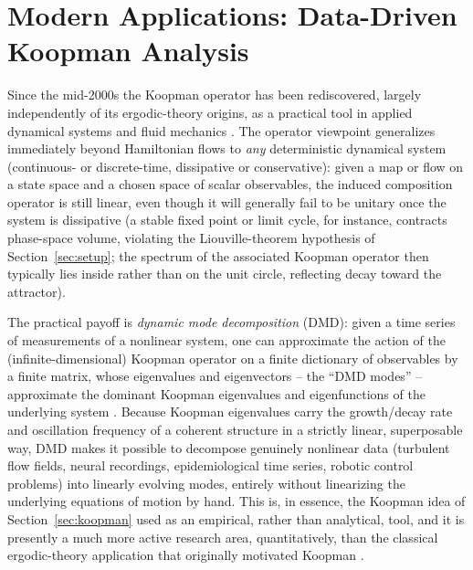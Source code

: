 \documentclass[11pt]{article}
\theoremstyle{remark}
\begin{document}
\section{Modern Applications: Data-Driven Koopman Analysis}
\label{sec:dmd}

Since the mid-2000s the Koopman operator has been rediscovered, largely independently of its ergodic-theory origins, as a practical tool in applied dynamical systems and fluid mechanics \cite{Mezic2005}. The operator viewpoint generalizes immediately beyond Hamiltonian flows to \emph{any} deterministic dynamical system (continuous- or discrete-time, dissipative or conservative): given a map or flow on a state space and a chosen space of scalar observables, the induced composition operator is still linear, even though it will generally fail to be unitary once the system is dissipative (a stable fixed point or limit cycle, for instance, contracts phase-space volume, violating the Liouville-theorem hypothesis of Section~\ref{sec:setup}; the spectrum of the associated Koopman operator then typically lies inside rather than on the unit circle, reflecting decay toward the attractor).

The practical payoff is \emph{dynamic mode decomposition} (DMD): given a time series of measurements of a nonlinear system, one can approximate the action of the (infinite-dimensional) Koopman operator on a finite dictionary of observables by a finite matrix, whose eigenvalues and eigenvectors -- the ``DMD modes'' -- approximate the dominant Koopman eigenvalues and eigenfunctions of the underlying system \cite{Schmid2010,RowleyEtAl2009}. Because Koopman eigenvalues carry the growth/decay rate and oscillation frequency of a coherent structure in a strictly linear, superposable way, DMD makes it possible to decompose genuinely nonlinear data (turbulent flow fields, neural recordings, epidemiological time series, robotic control problems) into linearly evolving modes, entirely without linearizing the underlying equations of motion by hand. This is, in essence, the Koopman idea of Section~\ref{sec:koopman} used as an empirical, rather than analytical, tool, and it is presently a much more active research area, quantitatively, than the classical ergodic-theory application that originally motivated Koopman \cite{Morgan2020}.

\end{document}
